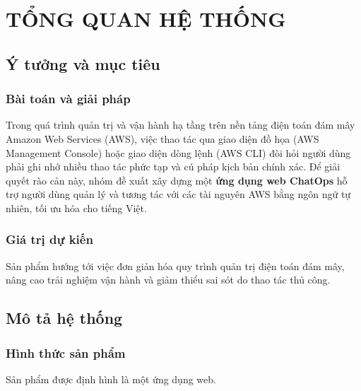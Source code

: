 \documentclass[a4paper,12pt]{article}
\begin{document}

\section{TỔNG QUAN HỆ THỐNG}

\subsection{Ý tưởng và mục tiêu}

\subsubsection{Bài toán và giải pháp}
Trong quá trình quản trị và vận hành hạ tầng trên nền tảng điện toán đám mây Amazon Web Services (AWS), việc thao tác qua giao diện đồ họa (AWS Management Console) hoặc giao diện dòng lệnh (AWS CLI) đòi hỏi người dùng phải ghi nhớ nhiều thao tác phức tạp và cú pháp kịch bản chính xác. Để giải quyết rào cản này, nhóm đề xuất xây dựng một \textbf{ứng dụng web ChatOps} hỗ trợ người dùng quản lý và tương tác với các tài nguyên AWS bằng ngôn ngữ tự nhiên, tối ưu hóa cho tiếng Việt.

\subsubsection{Giá trị dự kiến}
Sản phẩm hướng tới việc đơn giản hóa quy trình quản trị điện toán đám mây, nâng cao trải nghiệm vận hành và giảm thiểu sai sót do thao tác thủ công.

\subsection{Mô tả hệ thống}

\subsubsection{Hình thức sản phẩm}
Sản phẩm được định hình là một ứng dụng web.
\end{document}
